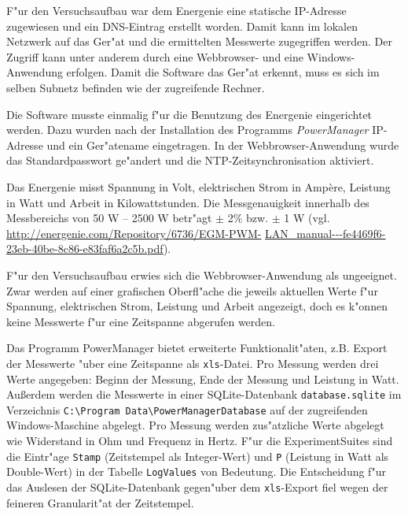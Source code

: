 F"ur den Versuchsaufbau war dem Energenie eine statische IP-Adresse zugewiesen und ein DNS-Eintrag erstellt worden. Damit kann im lokalen Netzwerk auf das Ger"at und die ermittelten Messwerte zugegriffen werden. Der Zugriff kann unter anderem durch eine Webbrowser- und eine Windows-Anwendung erfolgen. Damit die Software das Ger"at erkennt, muss es sich im selben Subnetz befinden wie der zugreifende Rechner. 

Die Software musste einmalig f"ur die Benutzung des Energenie eingerichtet werden. Dazu wurden nach der Installation des Programms \textit{PowerManager} IP-Adresse und ein Ger"atename eingetragen. In der Webbrowser-Anwendung wurde das Standardpasswort ge"andert und die NTP-Zeitsynchronisation aktiviert. 

\noindent
Das Energenie misst Spannung in Volt, elektrischen Strom in Amp\`{e}re, Leistung in Watt und Arbeit in Kilowattstunden. Die Messgenauigkeit innerhalb des Messbereichs von 50 W -- 2500 W betr"agt $\pm$ 2$\%$ bzw. $\pm$ 1 W (vgl. \url{http://energenie.com/Repository/6736/EGM-PWM-} \url{LAN_manual---fe4469f6-23eb-40be-8c86-e83faf6a2c5b.pdf}). %

F"ur den Versuchsaufbau erwies sich die Webbrowser-Anwendung als ungeeignet. Zwar werden auf einer grafischen Oberfl"ache die jeweils aktuellen Werte f"ur Spannung, elektrischen Strom, Leistung und Arbeit angezeigt, doch es k"onnen keine Messwerte f"ur eine Zeitspanne abgerufen werden. 

Das Programm PowerManager bietet erweiterte Funktionalit"aten, z.B. Export der Messwerte "uber eine Zeitspanne als \texttt{xls}-Datei. Pro Messung werden drei Werte angegeben: Beginn der Messung, Ende der Messung und Leistung in Watt. Au\ss erdem werden die Messwerte in einer SQLite-Datenbank \texttt{database.sqlite} im Verzeichnis \texttt{C:\textbackslash Program Data\textbackslash PowerManagerData\-base} auf der zugreifenden Windows-Maschine abgelegt. Pro Messung werden zus"atzliche Werte abgelegt wie Widerstand in Ohm und Frequenz in Hertz. F"ur die ExperimentSuites sind die Eintr"age \texttt{Stamp} (Zeitstempel als Integer-Wert) und \texttt{P} (Leistung in Watt als Double-Wert) in der Tabelle \texttt{LogValues} von Bedeutung. Die Entscheidung f"ur das Auslesen der SQLite-Datenbank gegen"uber dem \texttt{xls}-Export fiel wegen der feineren Granularit"at der Zeitstempel. 


